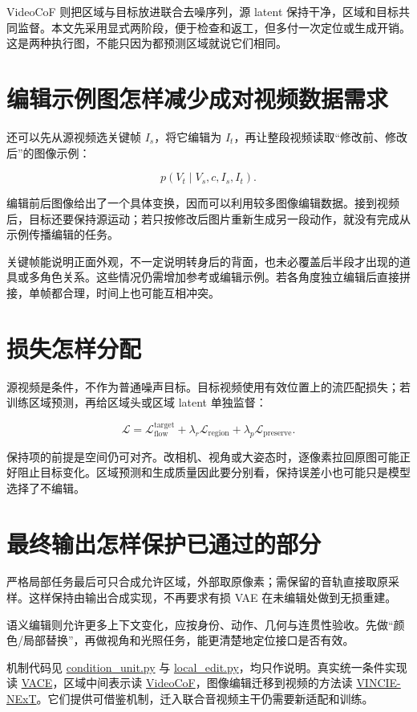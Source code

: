 VideoCoF 则把区域与目标放进联合去噪序列，源 latent 保持干净，区域和目标共同监督。本文先采用显式两阶段，便于检查和返工，但多付一次定位或生成开销。这是两种执行图，不能只因为都预测区域就说它们相同。

\section{编辑示例图怎样减少成对视频数据需求}\label{seedance-m17-ux7f16ux8f91ux793aux4f8bux56feux600eux6837ux51cfux5c11ux6210ux5bf9ux89c6ux9891ux6570ux636eux9700ux6c42}

还可以先从源视频选关键帧 \(I_s\)，将它编辑为 \(I_t\)，再让整段视频读取``修改前、修改后''的图像示例：

\[
p(V_t\mid V_s,c,I_s,I_t).
\]

编辑前后图像给出了一个具体变换，因而可以利用较多图像编辑数据。接到视频后，目标还要保持源运动；若只按修改后图片重新生成另一段动作，就没有完成从示例传播编辑的任务。

关键帧能说明正面外观，不一定说明转身后的背面，也未必覆盖后半段才出现的道具或多角色关系。这些情况仍需增加参考或编辑示例。若各角度独立编辑后直接拼接，单帧都合理，时间上也可能互相冲突。

\section{损失怎样分配}\label{seedance-m17-ux635fux5931ux600eux6837ux5206ux914d}

源视频是条件，不作为普通噪声目标。目标视频使用有效位置上的流匹配损失；若训练区域预测，再给区域头或区域 latent 单独监督：

\[
\mathcal{L}=\mathcal{L}^{\mathrm{target}}_{\mathrm{flow}}
+\lambda_r\mathcal{L}_{\mathrm{region}}
+\lambda_p\mathcal{L}_{\mathrm{preserve}}.
\]

保持项的前提是空间仍可对齐。改相机、视角或大姿态时，逐像素拉回原图可能正好阻止目标变化。区域预测和生成质量因此要分别看，保持误差小也可能只是模型选择了不编辑。

\section{最终输出怎样保护已通过的部分}\label{seedance-m17-ux6700ux7ec8ux8f93ux51faux600eux6837ux4fddux62a4ux5df2ux901aux8fc7ux7684ux90e8ux5206}

严格局部任务最后可只合成允许区域，外部取原像素；需保留的音轨直接取原采样。这样保持由输出合成实现，不再要求有损 VAE 在未编辑处做到无损重建。

语义编辑则允许更多上下文变化，应按身份、动作、几何与连贯性验收。先做``颜色/局部替换''，再做视角和光照任务，能更清楚地定位接口是否有效。

机制代码见 \hyperref[code-condition-unit]{condition\_unit.py} 与 \hyperref[code-local-edit]{local\_edit.py}，均只作说明。真实统一条件实现读 \href{https://github.com/ali-vilab/VACE}{VACE}，区域中间表示读 \href{https://github.com/knightyxp/VideoCoF}{VideoCoF}，图像编辑迁移到视频的方法读 \href{https://vincie-next.github.io/}{VINCIE-NExT}。它们提供可借鉴机制，迁入联合音视频主干仍需要新适配和训练。
